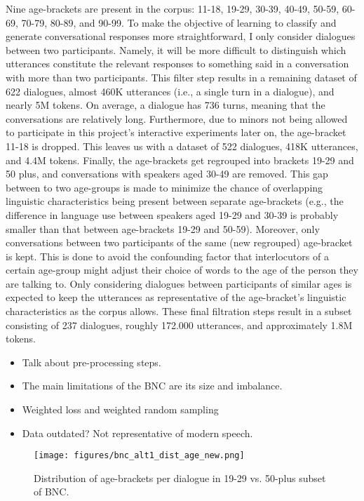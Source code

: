 Nine age-brackets are present in the corpus: 11-18, 19-29, 30-39, 40-49, 50-59, 60-69, 70-79, 80-89, and 90-99. To make the objective of learning to classify and generate conversational responses more straightforward, I only consider dialogues between two participants. Namely, it will be more difficult to distinguish which utterances constitute the relevant responses to something said in a conversation with more than two participants. This filter step results in a remaining dataset of 622 dialogues, almost 460K utterances (i.e., a single turn in a dialogue), and nearly 5M tokens. On average, a dialogue has 736 turns, meaning that the conversations are relatively long. Furthermore, due to minors not being allowed to participate in this project's interactive experiments later on, the age-bracket 11-18 is dropped. This leaves us with a dataset of 522 dialogues, 418K utterances, and 4.4M tokens. Finally, the age-brackets get regrouped into brackets 19-29 and 50 plus, and conversations with speakers aged 30-49 are removed. This gap between to two age-groups is made to minimize the chance of overlapping linguistic characteristics being present between separate age-brackets (e.g., the difference in language use between speakers aged 19-29 and 30-39 is probably smaller than that between age-brackets 19-29 and 50-59). Moreover, only conversations between two participants of the same (new regrouped) age-bracket is kept. This is done to avoid the confounding factor that interlocutors of a certain age-group might adjust their choice of words to the age of the person they are talking to. Only considering dialogues between participants of similar ages is expected to keep the utterances as representative of the age-bracket's linguistic characteristics as the corpus allows. These final filtration steps result in a subset consisting of 237 dialogues, roughly 172.000 utterances, and approximately 1.8M tokens.




\begin{itemize}
    \item Talk about pre-processing steps.
    \item The main limitations of the BNC are its size and imbalance. 
    \item Weighted loss and weighted random sampling
    \item Data outdated? Not representative of modern speech.
\end{itemize}

\begin{figure}[H]
    \centering
    \texttt{[image: figures/bnc\_alt1\_dist\_age\_new.png]}
    \caption{Distribution of age-brackets per dialogue in 19-29 vs. 50-plus subset of BNC.}
    \label{fig:dist_age_bnc}
\end{figure}



